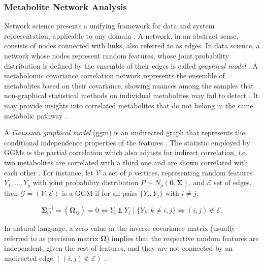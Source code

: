 \documentclass{amsart}
\begin{document}
\newpage\subsubsection{Metabolite Network Analysis}\label{rq3}
Network science presents a unifying framework for data and system representation, applicable to any domain \cite{Barabasi2015NetworkScience}. A network, in an abstract sense, consists of nodes connected with links, also referred to as edges. In data science, a network whose nodes represent random features, whose joint probability distribution is defined by the ensemble of their edges is called \textit{graphical model} \cite{Peeters2022Rags2ridges:Matrices}. A metabolomic covariance correlation network represents the ensemble of metabolites based on their covariance, showing nuances among the samples that non-graphical statistical methods on individual metabolites may fail to detect \cite{PerezDeSouza2020Network-basedInterpretation}. It may provide insights into correlated metabolites that do not belong in the same metabolic pathway \cite{PerezDeSouza2020Network-basedInterpretation}.


A \textit{Gaussian graphical model} (\acrshort{ggm}) is an undirected graph that represents the conditional independence properties of the features \cite{KollerProbabilisticTechniques}. The statistic employed by GGMs is the partial correlation which also adjusts for indirect correlation, i.e. two metabolites are correlated with a third one and are shown correlated with each other \cite{Amara2022NetworksInterpretation}. For instance, let $\mathcal{V}$ a set of $p$ vertices, representing random features $Y_1,...,Y_p$ with joint probability distribution $P \sim N_p(\mathbf{0, \Sigma})$, and $\mathcal{E}$ set of edges, then $\mathcal{G=(V,E)}$ is a GGM if for all pairs $\{Y_i , Y_j\}$ with $i\neq j$:

\[ \mathbf{\Sigma}_{ij}^{-1} = (\mathbf{\Omega}_{ij})=0 \Longleftrightarrow Y_i \Perp Y_j\mid\{Y_k : k \neq i,j\} \Longleftrightarrow (i, j) \notin \mathcal{E}.\]

In natural language, a zero value in the inverse covariance matrix (usually referred to as precision matrix $\mathbf{\Omega}$) implies that the respective random features are independent, given the rest of features, and they are not connected by an undirected edge $((i, j) \notin \mathcal{E})$ \cite{Peeters2022Rags2ridges:Matrices}.
\end{document}
